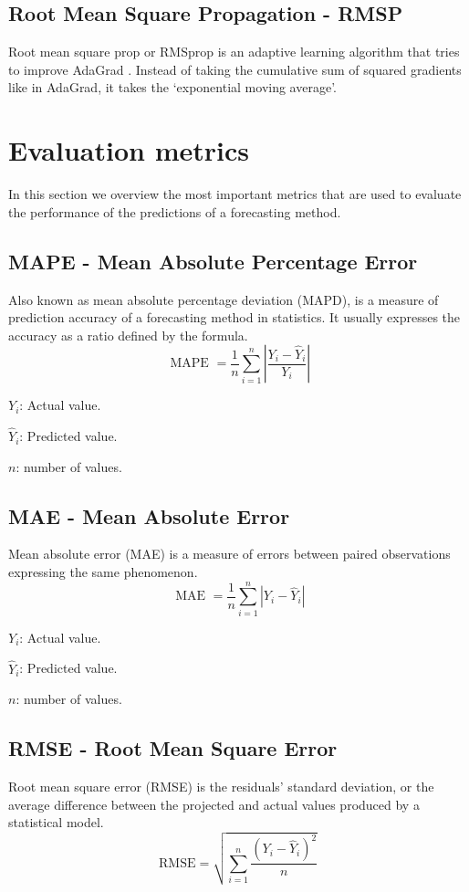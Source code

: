 \subsection{Root Mean Square Propagation - RMSP}
Root mean square prop or RMSprop \cite{rmsp} is an adaptive learning algorithm that tries to
improve AdaGrad \cite{ada}. Instead of taking the cumulative sum of squared gradients like
in AdaGrad, it takes the ‘exponential moving average’.

\section{Evaluation metrics}
In this section we overview the most important metrics that are used to evaluate the performance of the predictions of a forecasting method.

\subsection{MAPE - Mean Absolute Percentage Error}
\label{mape}
Also known as mean absolute percentage deviation (MAPD), is a measure of
prediction accuracy of a forecasting method in statistics. It usually expresses the
accuracy as a ratio defined by the formula.
\begin{equation}
	\text{ MAPE }=\frac{1}{n}\sum_{i=1}^{n}\left|\frac{Y_{i}-\hat{Y}_{i}}{Y_{i}}\right| 
\end{equation}

$Y_{i}$: Actual value.

$\hat{Y}_{i}$: Predicted value.

$n$: number of values.

\subsection{MAE - Mean Absolute Error}
\label{mae}
Mean absolute error (MAE) is a measure of errors between paired observations expressing
the same phenomenon.
\begin{equation}
	\text{ MAE }=\frac{1}{n}\sum_{i=1}^{n}\left|Y_{i}-\hat{Y}_{i}\right| 
\end{equation}

$Y_{i}$: Actual value.

$\hat{Y}_{i}$: Predicted value.

$n$: number of values.

\subsection{RMSE - Root Mean Square Error}
\label{rmse}
Root mean square error (RMSE) is the residuals' standard deviation, or the average
difference between the projected and actual values produced by a statistical model.
\begin{equation}
	\mathrm{RMSE}=\sqrt{\sum_{i=1}^{n}\frac{\left({Y}_i-\hat{Y}_i\right)^2}{n}}
\end{equation}

